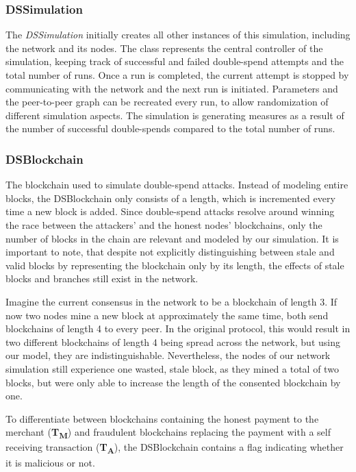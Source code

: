 \documentclass[a4paper,12pt,twoside]{report}
\begin{document}
\subsubsection{DSSimulation}
The \textit{DSSimulation} initially creates all other instances of this simulation, including the network and its nodes. The class represents the central controller of the simulation, keeping track of successful and failed double-spend attempts and the total number of runs. Once a run is completed, the current attempt is stopped by communicating with the network and the next run is initiated. Parameters and the peer-to-peer graph can be recreated every run, to allow randomization of different simulation aspects. The simulation is generating measures as a result of the number of successful double-spends compared to the total number of runs.
\subsubsection{DSBlockchain}
The blockchain used to simulate double-spend attacks. Instead of modeling entire blocks, the DSBlockchain only consists of a length, which is incremented every time a new block is added. Since double-spend attacks resolve around winning the race between the attackers' and the honest nodes' blockchains, only the number of blocks in the chain are relevant and modeled by our simulation. It is important to note, that despite not explicitly distinguishing between stale and valid blocks by representing the blockchain only by its length, the effects of stale blocks and branches still exist in the network. 

Imagine the current consensus in the network to be a blockchain of length 3. If now two nodes mine a new block at approximately the same time, both send blockchains of length 4 to every peer. In the original protocol, this would result in two different blockchains of length 4 being spread across the network, but using our model, they are indistinguishable. Nevertheless, the nodes of our network simulation still experience one wasted, stale block, as they mined a total of two blocks, but were only able to increase the length of the consented blockchain by one.

To differentiate between blockchains containing the honest payment to the merchant (\textbf{T\textsubscript{M}}) and fraudulent blockchains replacing the payment with a self receiving transaction (\textbf{T\textsubscript{A}}), the DSBlockchain contains a flag indicating whether it is malicious or not.
\end{document}
